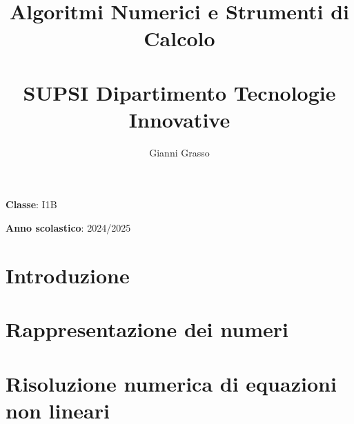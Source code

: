 \documentclass{article}
\title{
    Algoritmi Numerici e Strumenti di Calcolo \\
    \phantom{}\\
    \large SUPSI Dipartimento Tecnologie Innovative
}
\author{Gianni Grasso}
\begin{document}
\maketitle
\hphantom{ }
\vspace{14.5cm}

\textbf{Classe}: I1B

\textbf{Anno scolastico}: 2024/2025
\pagebreak


\tableofcontents
\pagebreak

\section{Introduzione}

\pagebreak


\section{Rappresentazione dei numeri}

\pagebreak

\section{Risoluzione numerica di equazioni non lineari}

\pagebreak
\end{document}
